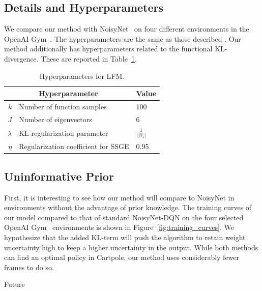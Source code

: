 \documentclass[]{uai2022} %
\begin{document}
\subsection{Details and Hyperparameters}
We compare our method with NoisyNet~\citep{fortunato_noisy_2019} on four different
environments in the OpenAI Gym~\citep{brockman_openai_2016-2}. The hyperparameters
are the same as those described  \cite{han_nrowan-dqn_2020}. Our method additionally
has hyperparameters related to the functional KL-divergence. These are reported in
Table~\ref{tab:hyperparams}.

\begin{table}
    \centering
    \caption{Hyperparameters for LFM.}\label{tab:hyperparams}
    \begin{tabular}{rll}
      \toprule %
      \multicolumn{2}{c}{Hyperparameter} & Value \\
      \midrule %
      \(k\)         & Number of function samples & 100\\
      \(J\)         & Number of eigenvectors & 6\\
      \(\lambda\)   & KL regularization parameter & \(\frac{1}{\lvert \mathcal{D}_s \rvert}\)\\
      \(\eta\)      & Regularization coefficient for SSGE & 0.95\\
      \bottomrule %
    \end{tabular}
\end{table}


\subsection{Uninformative Prior}
First, it is interesting to see how our method will compare to NoisyNet
in environments without the advantage of prior knowledge. The training curves
of our model compared to that of standard NoisyNet-DQN on the four selected OpenAI
Gym~\citep{brockman_openai_2016} environments is shown in Figure~\ref{fig:training_curves}.
We hypothesize that the added KL-term will push the algorithm to retain weight uncertainty high
to keep a higher uncertainty in the output. While both methods can
find an optimal policy in Cartpole, our method uses considerably fewer frames
to do so.

Future 
\end{document}
